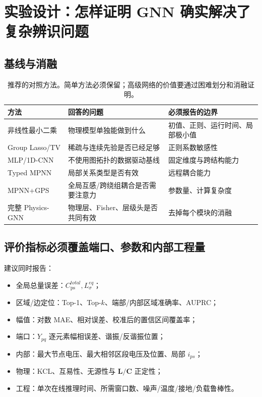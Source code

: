 \documentclass[UTF8,11pt,a4paper]{ctexart}
\newcommand{\Cps}{C_{\mathrm{ps}}}
\newcommand{\Ls}{L_{\sigma}}
\newcommand{\LL}{\bm L}
\newcommand{\CC}{\bm C}
\begin{document}
\section{实验设计：怎样证明 GNN 确实解决了复杂辨识问题}

\subsection{基线与消融}

\begin{table}[H]
\centering
\small
\begin{tabularx}{\textwidth}{p{3.0cm}X X}
\toprule
方法 & 回答的问题 & 必须报告的边界\\
\midrule
非线性最小二乘 & 物理模型单独能做到什么 & 初值、正则、运行时间、局部极小值\\
Group Lasso/TV & 稀疏与连续先验是否已经足够 & 正则系数敏感性\\
MLP/1D-CNN & 不使用图拓扑的数据驱动基线 & 固定维度与跨结构能力\\
Typed MPNN & 局部关系类型是否有效 & 远程耦合能力\\
MPNN+GPS & 全局互感/跨绕组耦合是否需要注意力 & 参数量、计算复杂度\\
完整 Physics-GNN & 物理层、Fisher、层级头是否共同有效 & 去掉每个模块的消融\\
\bottomrule
\end{tabularx}
\caption{推荐的对照方法。简单方法必须保留；高级网络的价值要通过困难划分和消融证明。}
\end{table}

\subsection{评价指标必须覆盖端口、参数和内部工程量}

建议同时报告：
\begin{itemize}
\item 全局总量误差：$\Cps^{total},\Ls^{eq}$；
\item 区域/边定位：Top-1、Top-$k$、端部/内部区域准确率、AUPRC；
\item 幅值：对数 MAE、相对误差、校准后的置信区间覆盖率；
\item 端口：$Y_{pq}$ 逐元素幅相误差、谐振/反谐振位置；
\item 内部：最大节点电压、最大相邻区段电压及位置、局部 $i_{ps}$；
\item 物理：KCL、互易性、无源性与 $\LL/\CC$ 正定性；
\item 工程：单次在线推理时间、所需窗口数、噪声/温度/接地/负载鲁棒性。
\end{itemize}
\end{document}
